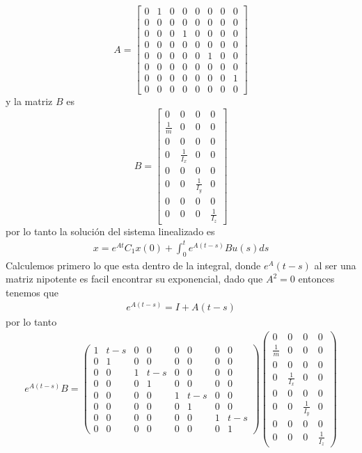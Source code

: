 \documentclass{uofa-eng-assignment}
\begin{document}
\[
A = \begin{bmatrix}
0 & 1 & 0 & 0 & 0 & 0 & 0 & 0 \\
0 & 0 & 0 & 0 & 0 & 0 & 0 & 0 \\
0 & 0 & 0 & 1 & 0 & 0 & 0 & 0 \\
0 & 0 & 0 & 0 & 0 & 0& 0 & 0  \\
0 & 0 & 0 & 0 & 0 & 1 & 0 & 0 \\
0 & 0 & 0 & 0 & 0 & 0 & 0 & 0 \\
0 & 0 & 0 & 0 & 0 & 0 & 0 & 1 \\
0 & 0 & 0 & 0 & 0 & 0 & 0 & 0 
\end{bmatrix}
\]
y la matriz $B$ es
\[
B = \begin{bmatrix}
0 & 0 & 0 & 0 \\
\frac{1}{m} & 0 & 0 & 0 \\
0 & 0 & 0 & 0 \\
0 & \frac{1}{I_x} & 0 & 0 \\
0 & 0 & 0 & 0 \\
0 & 0 & \frac{1}{I_y} & 0 \\
0 & 0 & 0 & 0 \\
0 & 0 & 0 & \frac{1}{I_z}
\end{bmatrix}
\]
por lo tanto la solución del sistema linealizado es
\begin{align*}
    x = e^{At} C_1 x(0) + \int_0^t e^{A(t-s)} B  u(s) ds  
\end{align*}
Calculemos primero lo que esta dentro de la integral, donde $e^A(t-s)$ al ser una matriz nipotente
es facil encontrar su exponencial, dado que $A^2=0$ entonces tenemos que
\begin{align*}
    e^{A(t-s)} = I + A(t-s)
\end{align*}
por lo tanto
\begin{align*}
    e^{A(t-s)} B = \left(\begin{matrix}
1 & t-s & 0 & 0 & 0 & 0 & 0 & 0 \\
0 & 1 & 0 & 0 & 0 & 0 & 0 & 0 \\
0 & 0 & 1 & t-s & 0 & 0 & 0 & 0 \\
0 & 0 & 0 & 1 & 0 & 0 & 0 & 0 \\
0 & 0 & 0 & 0 & 1 & t-s & 0 & 0 \\
0 & 0 & 0 & 0 & 0 & 1 & 0 & 0 \\
0 & 0 & 0 & 0 & 0 & 0 & 1 & t-s \\
0 & 0 & 0 & 0 & 0 & 0 & 0 & 1
\end{matrix}\right)
\left(\begin{matrix}
0 & 0 & 0 & 0 \\
\frac{1}{m} & 0 & 0 & 0 \\
0 & 0 & 0 & 0 \\
0 & \frac{1}{I_x} & 0 & 0 \\
0 & 0 & 0 & 0 \\
0 & 0 & \frac{1}{I_y} & 0 \\
0 & 0 & 0 & 0 \\
0 & 0 & 0 & \frac{1}{I_z}
\end{matrix}\right) 
\end{align*}
\end{document}
